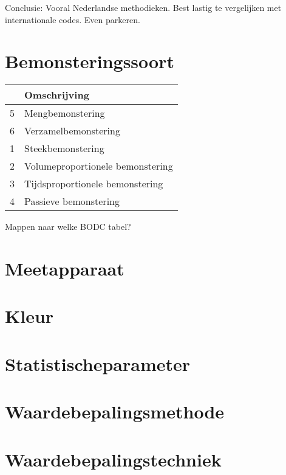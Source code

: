 \documentclass[
]{book}
\begin{document}
Conclusie: Vooral Nederlandse methodieken. Best lastig te vergelijken met internationale codes. Even parkeren.

\hypertarget{bemonsteringssoort}{%
\section{Bemonsteringssoort}\label{bemonsteringssoort}}

\begin{tabular}[t]{l|l}
\hline
  & Omschrijving\\
\hline
5 & Mengbemonstering\\
\hline
6 & Verzamelbemonstering\\
\hline
1 & Steekbemonstering\\
\hline
2 & Volumeproportionele bemonstering\\
\hline
3 & Tijdsproportionele bemonstering\\
\hline
4 & Passieve bemonstering\\
\hline
\end{tabular}

Mappen naar welke BODC tabel?

\hypertarget{meetapparaat}{%
\section{Meetapparaat}\label{meetapparaat}}

\hypertarget{kleur}{%
\section{Kleur}\label{kleur}}

\hypertarget{statistischeparameter}{%
\section{Statistischeparameter}\label{statistischeparameter}}

\hypertarget{waardebepalingsmethode}{%
\section{Waardebepalingsmethode}\label{waardebepalingsmethode}}

\hypertarget{waardebepalingstechniek}{%
\section{Waardebepalingstechniek}\label{waardebepalingstechniek}}
\end{document}
